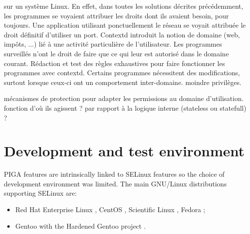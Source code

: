 \documentclass[pdftex,a4paper,titlepage,11pt]{article}
\begin{document}
%
sur un système Linux. En effet, dans toutes les solutions décrites précédemment,
les programmes se voyaient attribuer les droits dont ils avaient besoin, pour
toujours. Une application utilisant ponctuellement le réseau se voyait attribuée
le droit définitif d'utiliser un port. Contextd introduit la notion de domaine
(web, impôts, ...) lié à une activité particulière de l'utilisateur. Les
programmes surveillés n'ont le droit de faire que ce qui leur est autorisé dans
le domaine courant.
Rédaction et test des règles exhaustives pour faire fonctionner les programmes
avec contextd. Certains programmes nécessitent des modifications, surtout
lorsque ceux-ci ont un comportement inter-domaine.
moindre privilèges.

%
mécanismes de protection pour adapter les permissions au domaine d'utilisation.
%
%
fonction d'où ils agissent ? par rapport à la logique interne (stateless ou
statefull) ?

\newpage

\section{Development and test environment}

PIGA features are intrinsically linked to SELinux features so the choice of
development environment was limited. The main GNU/Linux distributions supporting
SELinux are:

\begin{itemize}
	\item Red Hat Enterprise Linux \cite{RHEL}, CentOS \cite{CENTOS}, Scientific
Linux \cite{SL}, Fedora \cite{FEDORA};
	\item Gentoo \cite{GENTOO} with the Hardened Gentoo project \cite{GENTOOH}.
\end{itemize}
\end{document}
